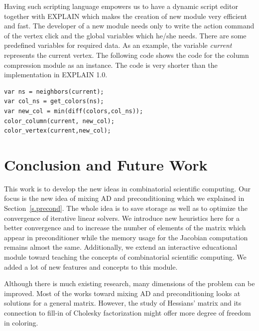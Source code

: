 \documentclass[12pt, oneside]{book}
\newcommand{\secref}[1]{Section~\protect\ref{#1}}
\begin{document}
Having such scripting language empowers us to have a dynamic script editor 
together with EXPLAIN which makes the creation of new module very efficient and fast.
The developer of a new module needs only to write the action command of the vertex
click and the global variables which he/she needs.
There are some predefined variables for required data.
As an example, the variable \textit{current} represents the current vertex.
The following code shows the code for the column compression 
module as an instance. The code is very shorter than the implementation in EXPLAIN 1.0.
\begin{lstlisting}
var ns = neighbors(current);
var col_ns = get_colors(ns);
var new_col = min(diff(colors,col_ns));
color_column(current, new_col);
color_vertex(current,new_col);
\end{lstlisting}

\chapter{Conclusion and Future Work}
\label{conc}
This work is to develop the new ideas in combinatorial scientific
computing. Our focus is the new idea of mixing AD and preconditioning which we explained in \secref{s.precond}. The whole idea is to save storage as well as to optimize the convergence of iterative linear solvers. We introduce new heuristics here for a better convergence and to increase the number of elements of the matrix which appear in preconditioner while the memory usage for the Jacobian computation
remains almost the same. Additionally, we extend an interactive educational module toward teaching the concepts of combinatorial scientific computing. We added a lot of new features and concepts to this module.

Although there is much existing research, many dimensions of the problem can be improved. Most of the works toward mixing AD and preconditioning looks at solutions for a general matrix. However, the study of Hessians' matrix and its connection to fill-in of Cholesky factorization might offer more degree of freedom in coloring. 
\end{document}
